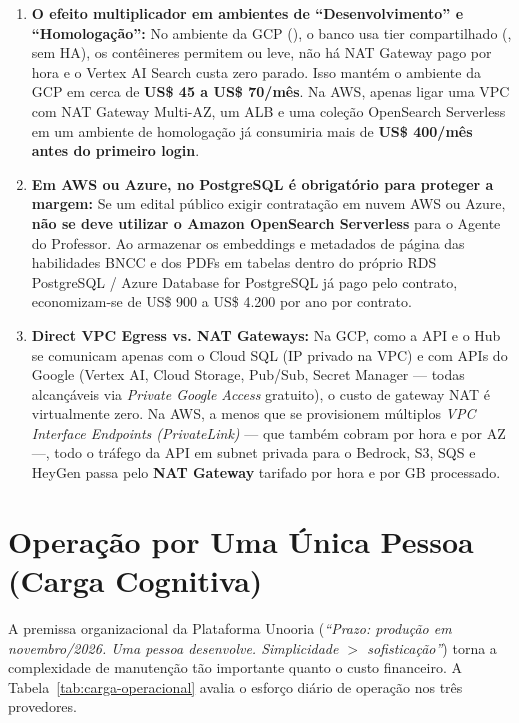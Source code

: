 \begin{enumerate}
  \item \textbf{O efeito multiplicador em ambientes de ``Desenvolvimento'' e ``Homologação'':}
  No ambiente  da GCP (), o banco usa tier compartilhado (, sem HA), os contêineres permitem  ou  leve, não há NAT Gateway pago por hora e o Vertex AI Search custa zero parado. Isso mantém o ambiente  da GCP em cerca de \textbf{US\$ 45 a US\$ 70/mês}. Na AWS, apenas ligar uma VPC com NAT Gateway Multi-AZ, um ALB e uma coleção OpenSearch Serverless em um ambiente de homologação já consumiria mais de \textbf{US\$ 400/mês antes do primeiro login}.

  \item \textbf{Em AWS ou Azure,  no PostgreSQL é obrigatório para proteger a margem:}
  Se um edital público exigir contratação em nuvem AWS ou Azure, \textbf{não se deve utilizar o Amazon OpenSearch Serverless} para o Agente do Professor. Ao armazenar os embeddings e metadados de página das habilidades BNCC e dos PDFs em tabelas  dentro do próprio RDS PostgreSQL / Azure Database for PostgreSQL já pago pelo contrato, economizam-se de US\$ 900 a US\$ 4.200 por ano por contrato.

  \item \textbf{Direct VPC Egress vs. NAT Gateways:}
  Na GCP, como a API e o Hub se comunicam apenas com o Cloud SQL (IP privado na VPC) e com APIs do Google (Vertex AI, Cloud Storage, Pub/Sub, Secret Manager --- todas alcançáveis via \emph{Private Google Access} gratuito), o custo de gateway NAT é virtualmente zero. Na AWS, a menos que se provisionem múltiplos \emph{VPC Interface Endpoints (PrivateLink)} --- que também cobram por hora e por AZ ---, todo o tráfego da API em subnet privada para o Bedrock, S3, SQS e HeyGen passa pelo \textbf{NAT Gateway} tarifado por hora e por GB processado.
\end{enumerate}

\section{Operação por Uma Única Pessoa (Carga Cognitiva)}
\label{sec:operacao-solo}

A premissa organizacional da Plataforma Unooria (\emph{``Prazo: produção em novembro/2026. Uma pessoa desenvolve. Simplicidade $>$ sofisticação''}) torna a complexidade de manutenção tão importante quanto o custo financeiro. A Tabela~\ref{tab:carga-operacional} avalia o esforço diário de operação nos três provedores.

